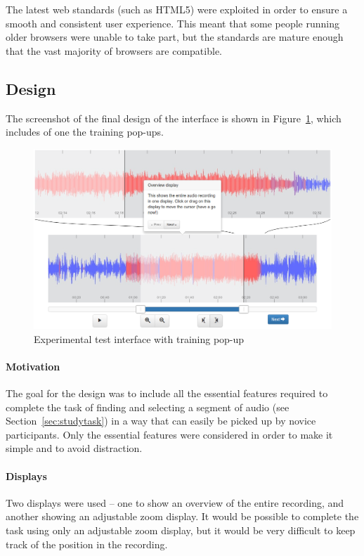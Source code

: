 The latest web standards (such as HTML5) were exploited in order to ensure a
smooth and consistent user experience. This meant that some people running
older browsers were unable to take part, but the standards are mature enough
that the vast majority of browsers are compatible.

\subsection{Design}\label{sec:interfacedesign}
The screenshot of the  final design of the interface is shown in
Figure~\ref{fig:interface}, which includes of one the training pop-ups.

\begin{figure}[ht]
  \centering
  \includegraphics[width=\textwidth]{figs/interface.png}
  \caption{Experimental test interface with training pop-up}
  \label{fig:interface}
\end{figure}

\paragraph{Motivation}
The goal for the design was to include all the essential features required to
complete the task of finding and selecting a segment of audio (see
Section~\ref{sec:studytask}) in a way that can easily be picked up by novice
participants. Only the essential features were considered in order to make it
simple and to avoid distraction.

\paragraph{Displays}
Two displays were used -- one to show an overview of the entire recording, and
another showing an adjustable zoom display. It would be possible to complete
the task using only an adjustable zoom display, but it would be very difficult
to keep track of the position in the recording.

